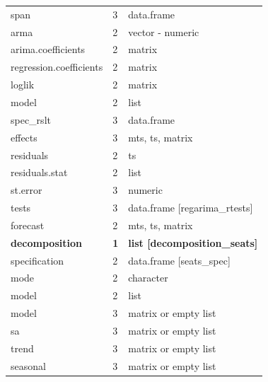 \documentclass[article]{jss}
\begin{document}
\begin{longtable}{lll}
\hspace{3em}span & 3 & data.frame\\
\addlinespace
\hspace{2em}arma & 2 & vector - numeric\\
\hspace{2em}arima.coefficients & 2 & matrix\\
\hspace{2em}regression.coefficients & 2 & matrix\\
\hspace{2em}loglik & 2 & matrix\\
\hspace{2em}model & 2 & \vphantom{1} list\\
\addlinespace
\hspace{3em}spec\_rslt & 3 & data.frame\\
\hspace{3em}effects & 3 & mts, ts, matrix\\
\hspace{2em}residuals & 2 & ts\\
\hspace{2em}residuals.stat & 2 & list\\
\hspace{3em}st.error & 3 & numeric\\
\addlinespace
\hspace{3em}tests & 3 & data.frame [regarima\_rtests]\\
\hspace{2em}forecast & 2 & mts, ts, matrix\\
\textbf{\hspace{1em}decomposition} & \textbf{1} & \textbf{list [decomposition\_seats]}\\
\hspace{2em}specification & 2 & data.frame [seats\_spec]\\
\hspace{2em}mode & 2 & character\\
\addlinespace
\hspace{2em}model & 2 & list\\
\hspace{3em}model & 3 & matrix or empty list\\
\hspace{3em}sa & 3 & matrix or empty list\\
\hspace{3em}trend & 3 & matrix or empty list\\
\hspace{3em}seasonal & 3 & matrix or empty list\\

\end{longtable}
\end{document}
